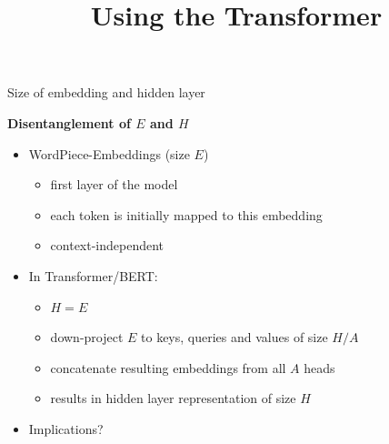 



\newcommand{\titlefigure}{figure/sesamestreet.jpeg}
\newcommand{\learninggoals}{
\item Understand the improvements over BERT
\item Parameter sharing
\item Disentangling $E$ and $H$}

\title{Using the Transformer}
\date{}




\begin{frame}{Size of embedding and hidden layer}

\vfill

	\textbf{Disentanglement of $E$ and $H$}

	\begin{itemize}
		\item	WordPiece-Embeddings (size $E$) 
			\begin{itemize}
				\item first layer of the model
				\item each token is initially mapped to this embedding
				\item context-independent
			\end{itemize}
		\item In Transformer/BERT: 
			\begin{itemize}
				\item $H = E$
				\item down-project $E$ to keys, queries and values of size $H/A$
				\item concatenate resulting embeddings from all $A$ heads
				\item results in hidden layer representation of size $H$
			\end{itemize}
		\item Implications?
	\end{itemize}

\vfill

\end{frame}


